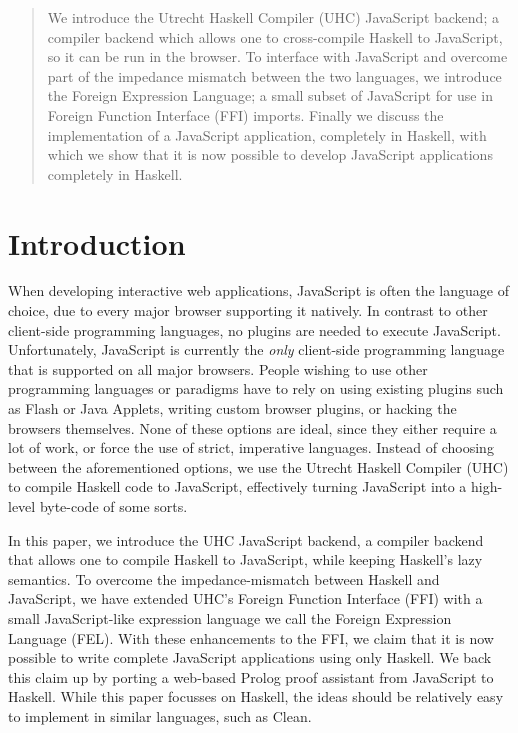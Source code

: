 \documentclass{llncs}
\begin{document}
\setlength{\parindent}{0mm}
\addtolength{\parskip}{0.25\baselineskip}




\begin{abstract}
We introduce the Utrecht Haskell Compiler (UHC) JavaScript backend; a compiler
backend which allows one to cross-compile Haskell to JavaScript, so it can be
run in the browser. To interface with JavaScript and overcome part of the
impedance mismatch between the two languages, we introduce the Foreign
Expression Language; a small subset of JavaScript for use in Foreign Function
Interface (FFI) imports. Finally we discuss the implementation of a JavaScript
application, completely in Haskell, with which we show that it is now possible
to develop JavaScript applications completely in Haskell.
\end{abstract}





\section{Introduction}

When developing interactive web applications, JavaScript is often the language
of choice, due to every major browser supporting it natively. In contrast to
other client-side programming languages, no plugins are needed to execute
JavaScript. Unfortunately, JavaScript is currently the \textit{only}
client-side programming language that is supported on all major browsers.
People wishing to use other programming languages or paradigms have to rely on
using existing plugins such as Flash or Java Applets, writing custom browser
plugins, or hacking the browsers themselves. None of these options are ideal,
since they either require a lot of work, or force the use of strict, imperative
languages. Instead of choosing between the aforementioned options, we use the
Utrecht Haskell Compiler (UHC) \cite{dijkstra09uhc-arch,www09uhc} to compile
Haskell code to JavaScript, effectively turning JavaScript into a high-level
byte-code of some sorts.

In this paper, we introduce the UHC JavaScript backend, a compiler backend that
allows one to compile Haskell to JavaScript, while keeping Haskell's lazy
semantics. To overcome the impedance-mismatch between Haskell and JavaScript,
we have extended UHC's Foreign Function Interface (FFI) with a small
JavaScript-like expression language we call the Foreign Expression Language
(FEL). With these enhancements to the FFI, we claim that it is now possible to
write complete JavaScript applications using only Haskell. We back this claim
up by porting a web-based Prolog proof assistant from JavaScript to Haskell.
While this paper focusses on Haskell, the ideas should be relatively easy to
implement in similar languages, such as Clean.
\end{document}

